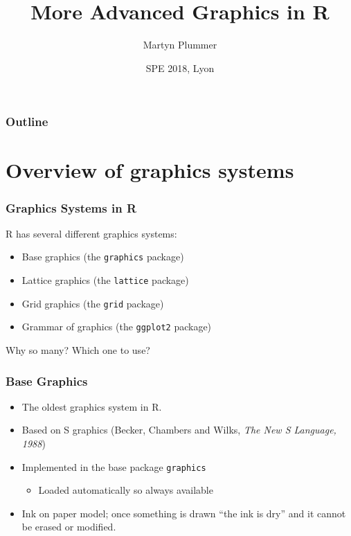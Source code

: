\documentclass[xcolor=svgnames]{beamer}
\title{More Advanced Graphics in R}
\author[Martyn Plummer]
{Martyn Plummer}
\institute[IARC] %
{
  International Agency for Research on Cancer\\
  Lyon, France
}
\date[SPE 2018] %
{SPE 2018, Lyon}
\newcommand{\code}[1]{\texttt{#1}}
\begin{document}
\begin{frame}[plain]
  \titlepage
\end{frame}

\begin{frame}
  \frametitle{Outline}
  \tableofcontents
\end{frame}

\section{Overview of graphics systems}

\begin{frame}
  \frametitle{Graphics Systems in R}  

  R has several different graphics systems: 
  \begin{itemize}
  \item Base graphics (the \code{graphics} package)
  \item Lattice graphics (the \code{lattice} package)
  \item Grid graphics (the \code{grid} package)
  \item Grammar of graphics (the \code{ggplot2} package)
  \end{itemize}
  Why so many? Which one to use?
  
\end{frame}

\begin{frame}
  \frametitle{Base Graphics}
  \begin{itemize}
  \item The oldest graphics system in R.
  \item Based on S graphics (Becker, Chambers and Wilks, 
    {\em The New S Language, 1988})
  \item Implemented in the base package \code{graphics} 
    \begin{itemize}
    \item Loaded automatically so always available
    \end{itemize}
  \item Ink on paper model; once something is drawn ``the ink is dry'' and it 
    cannot be erased or modified.
  \end{itemize}
\end{frame}
\end{document}
